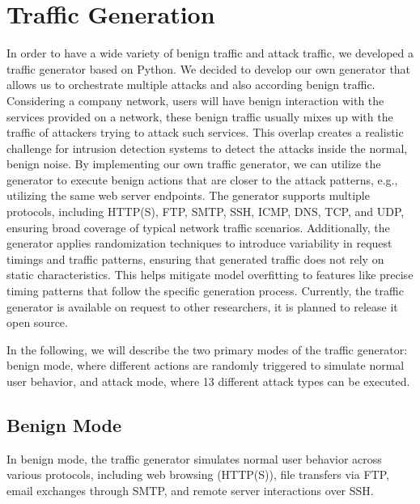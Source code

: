 \section{Traffic Generation}
In order to have a wide variety of benign traffic and attack traffic, we developed a traffic generator based on Python. We decided to develop our own generator that allows us to orchestrate multiple attacks and also according benign traffic. Considering a company network, users will have benign interaction with the services provided on a network, these benign traffic usually mixes up with the traffic of attackers trying to attack such services. This overlap creates a realistic challenge for intrusion detection systems to detect the attacks inside the normal, benign noise. By implementing our own traffic generator, we can utilize the generator to execute benign actions that are closer to the attack patterns, e.g., utilizing the same web server endpoints. The generator supports multiple protocols, including HTTP(S), FTP, SMTP, SSH, ICMP, DNS, TCP, and UDP, ensuring broad coverage of typical network traffic scenarios. Additionally, the generator applies randomization techniques to introduce variability in request timings and traffic patterns, ensuring that generated traffic does not rely on static characteristics. This helps mitigate model overfitting to features like precise timing patterns that follow the specific generation process. Currently, the traffic generator is available on request to other researchers, it is planned to release it open source.

In the following, we will describe the two primary modes of the traffic generator: benign mode, where different actions are randomly triggered to simulate normal user behavior, and attack mode, where 13 different attack types can be executed.

\subsection{Benign Mode}
In benign mode, the traffic generator simulates normal user behavior across various protocols, including web browsing (HTTP(S)), file transfers via FTP, email exchanges through SMTP, and remote server interactions over SSH.

